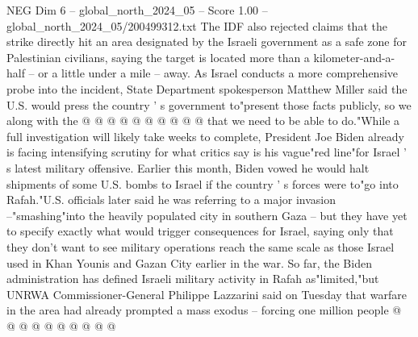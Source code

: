 \begin{textsample}{NEG Dim 6 – global\_north\_2024\_05 – Score 1.00 – global\_north\_2024\_05/200499312.txt}
The IDF also rejected claims that the strike directly hit an area designated by the Israeli government as a safe zone for Palestinian civilians, saying the target is located more than a kilometer-and-a-half -- or a little under a mile -- away.
As Israel conducts a more comprehensive probe into the incident, State Department spokesperson Matthew Miller said the U.S. would press the country ' s government to"present those facts publicly, so we along with the @ @ @ @ @ @ @ @ @ @ that we need to be able to do."While a full investigation will likely take weeks to complete, President Joe Biden already is facing intensifying scrutiny for what critics say is his vague"red line"for Israel ' s latest military offensive.
Earlier this month, Biden vowed he would halt shipments of some U.S. bombs to Israel if the country ' s forces were to"go into Rafah."U.S. officials later said he was referring to a major invasion --"smashing"into the heavily populated city in southern Gaza -- but they have yet to specify exactly what would trigger consequences for Israel, saying only that they don't want to see military operations reach the same scale as those Israel used in Khan Younis and Gazan City earlier in the war.
So far, the Biden administration has defined Israeli military activity in Rafah as"limited,"but UNRWA Commissioner-General Philippe Lazzarini said on Tuesday that warfare in the area had already prompted a mass exodus -- forcing one million people @ @ @ @ @ @ @ @ @ @

\end{textsample}
